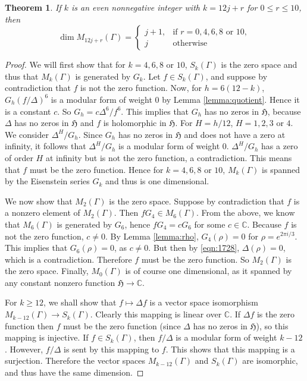 \documentclass{article}
\newtheorem{theorem}{Theorem}
\begin{document}
\begin{theorem}
If $k$ is an even nonnegative integer with $k=12j+r$ for $0 \leq r \leq 10$, then
\[
\dim M_{12j+r}(\Gamma)=
\begin{cases}
j+1,&\textrm{if $r=0,4,6,8$ or $10$},\\
j&\textrm{otherwise}
\end{cases}
\]
\end{theorem}
\begin{proof}
We will first show that for $k=4,6,8$ or $10$, $S_k(\Gamma)$ is the zero space and thus that
$M_k(\Gamma)$ is generated by $G_k$. Let $f \in S_k(\Gamma)$, and suppose by contradiction that $f$ is not
the zero function.
Now, for $h=6(12-k)$,
$G_h(f/\Delta)^6$ is a modular form of weight 0 by Lemma \ref{lemma:quotient}. Hence it is a constant $c$. 
So
$G_h=c\Delta^6/f^6$.
This implies that $G_h$ has no zeros in $\mathfrak{H}$, because $\Delta$ has no zeros in $\mathfrak{H}$ and $f$ is holomorphic in $\mathfrak{H}$. For $H=h/12$, $H=1,2,3$ or $4$. We consider $\Delta^H/G_h$. 
Since $G_h$ has no zeros in $\mathfrak{H}$ and does not have a zero at infinity, 
it follows that $\Delta^H/G_h$ is a modular form of weight $0$.
$\Delta^H/G_h$ has a zero of order $H$ at infinity but is not the zero function, a contradiction. 
This means that $f$ must be the zero function. Hence for $k=4,6,8$ or $10$, $M_k(\Gamma)$ is spanned by the Eisenstein series
$G_k$ and thus is one dimensional.

We now show that $M_2(\Gamma)$ is the zero space. Suppose by contradiction that $f$ is a nonzero element of $M_2(\Gamma)$. Then
$fG_4 \in M_6(\Gamma)$. From the above, we know that $M_6(\Gamma)$ is generated by $G_6$, hence
$fG_4=cG_6$ for some $c \in \mathbb{C}$. Because $f$ is not the zero function, $c \neq 0$.
By Lemma \ref{lemma:rho}, $G_4(\rho)=0$ for $\rho=e^{2\pi i/3}$. This implies that $G_6(\rho)=0$, as $c \neq 0$.
But then by \eqref{eqn:1728}, $\Delta(\rho)=0$, which is a contradiction. Therefore $f$ must be the zero function. 
So $M_2(\Gamma)$ is the zero space. Finally, $M_0(\Gamma)$ is of course one dimensional, as it
spanned by any constant nonzero function $\mathfrak{H} \to \mathbb{C}$. 

For $k \geq 12$, we shall show that $f \mapsto \Delta f$ is a vector space isomorphism $M_{k-12}(\Gamma) \to S_k(\Gamma)$.
Clearly this mapping is linear over $\mathbb{C}$.
If $\Delta f$ is the zero function then $f$ must be the zero function (since $\Delta$ has no zeros
in $\mathfrak{H}$), so 
this mapping is injective.
If $f \in S_k(\Gamma)$, then $f/\Delta$ is a modular form of weight
$k-12$. However, $f/\Delta$ is sent by this mapping to $f$.
This shows that this mapping is a surjection. Therefore
the
vector spaces $M_{k-12}(\Gamma)$ and $S_k(\Gamma)$ are isomorphic, and thus have the 
same dimension. 
\end{proof}
\end{document}

